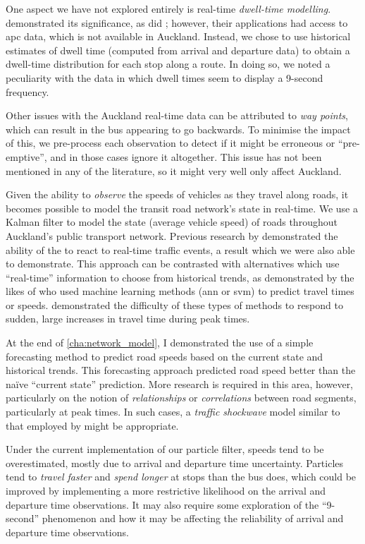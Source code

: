 One aspect we have not explored entirely is real-time \emph{dwell-time modelling}. \citet{Shalaby_2004} demonstrated its significance, as did \citet{Hans_2015}; however, their applications had access to \gls{apc} data, which is not available in Auckland. Instead, we chose to use historical estimates of dwell time (computed from arrival and departure data) to obtain a dwell-time distribution for each stop along a route. In doing so, we noted a peculiarity with the data in which dwell times seem to display a 9-second frequency.


Other issues with the Auckland real-time data can be attributed to \emph{way points}, which can result in the bus appearing to go backwards. To minimise the impact of this, we pre-process each observation to detect if it might be erroneous or ``pre-emptive'', and in those cases ignore it altogether. This issue has not been mentioned in any of the literature, so it might very well only affect Auckland.


Given the ability to \emph{observe} the speeds of vehicles as they travel along roads, it becomes possible to model the transit road network's state in real-time. We use a Kalman filter to model the state (average vehicle speed) of roads throughout Auckland's public transport network. Previous research by \citet{Shalaby_2004} demonstrated the ability of the \kf{} to react to real-time traffic events, a result which we were also able to demonstrate. This approach can be contrasted with alternatives which use ``real-time'' information to choose from historical trends, as demonstrated by the likes of \citet{Chen_2014,Julio_2016,Yu_2010,Yu_2011,Celan_2017} who used machine learning methods (\gls{ann} or \gls{svm}) to predict travel times or speeds.  demonstrated the difficulty of these types of methods to respond to sudden, large increases in travel time during peak times.


At the end of \cref{cha:network_model}, I demonstrated the use of a simple forecasting method to predict road speeds based on the current state and historical trends. This forecasting approach predicted road speed better than the na\"ive ``current state'' prediction. More research is required in this area, however, particularly on the notion of \emph{relationships} or \emph{correlations} between road segments, particularly at peak times. In such cases, a \emph{traffic shockwave} model similar to that employed by \citet{Julio_2016} might be appropriate.


Under the current implementation of our particle filter, speeds tend to be overestimated, mostly due to arrival and departure time uncertainty. Particles tend to \emph{travel faster} and \emph{spend longer} at stops than the bus does, which could be improved by implementing a more restrictive likelihood on the arrival and departure time observations. It may also require some exploration of the ``9-second'' phenomenon and how it may be affecting the reliability of arrival and departure time observations.


